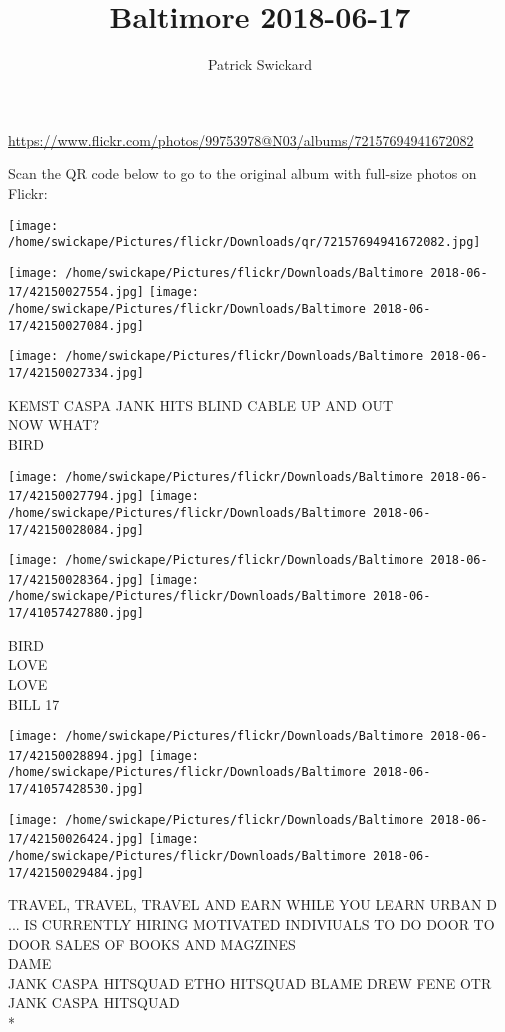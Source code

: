 \documentclass[10pt,letterpaper]{article}
\title{Baltimore 2018-06-17}
\author{Patrick Swickard}
\date{}
\begin{document}
\maketitle

\url{https://www.flickr.com/photos/99753978@N03/albums/72157694941672082}

Scan the QR code below to go to the original album with full-size photos on Flickr:

\texttt{[image: /home/swickape/Pictures/flickr/Downloads/qr/72157694941672082.jpg]}
\pagebreak

\texttt{[image: /home/swickape/Pictures/flickr/Downloads/Baltimore 2018-06-17/42150027554.jpg]}
\texttt{[image: /home/swickape/Pictures/flickr/Downloads/Baltimore 2018-06-17/42150027084.jpg]}

\vspace{0.25in}
\texttt{[image: /home/swickape/Pictures/flickr/Downloads/Baltimore 2018-06-17/42150027334.jpg]}

KEMST CASPA JANK HITS BLIND CABLE UP AND OUT\\
NOW WHAT?\\
BIRD
\pagebreak

\texttt{[image: /home/swickape/Pictures/flickr/Downloads/Baltimore 2018-06-17/42150027794.jpg]}
\texttt{[image: /home/swickape/Pictures/flickr/Downloads/Baltimore 2018-06-17/42150028084.jpg]}

\texttt{[image: /home/swickape/Pictures/flickr/Downloads/Baltimore 2018-06-17/42150028364.jpg]}
\texttt{[image: /home/swickape/Pictures/flickr/Downloads/Baltimore 2018-06-17/41057427880.jpg]}

BIRD\\
LOVE\\
LOVE\\
BILL 17
\pagebreak

\texttt{[image: /home/swickape/Pictures/flickr/Downloads/Baltimore 2018-06-17/42150028894.jpg]}
\texttt{[image: /home/swickape/Pictures/flickr/Downloads/Baltimore 2018-06-17/41057428530.jpg]}

\texttt{[image: /home/swickape/Pictures/flickr/Downloads/Baltimore 2018-06-17/42150026424.jpg]}
\texttt{[image: /home/swickape/Pictures/flickr/Downloads/Baltimore 2018-06-17/42150029484.jpg]}

TRAVEL, TRAVEL, TRAVEL AND EARN WHILE YOU LEARN URBAN D ... IS CURRENTLY HIRING MOTIVATED INDIVIUALS TO DO DOOR TO DOOR SALES OF BOOKS AND MAGZINES\\
DAME\\
JANK CASPA HITSQUAD ETHO HITSQUAD BLAME DREW FENE OTR JANK CASPA HITSQUAD\\
*
\pagebreak
\end{document}
